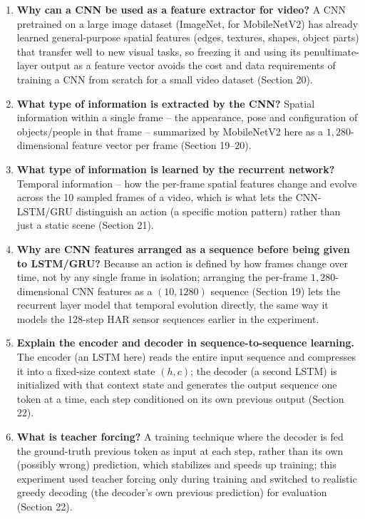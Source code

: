 \documentclass[10pt]{article}
\begin{document}
\begin{enumerate}
\item \textbf{Why can a CNN be used as a feature extractor for video?}
A CNN pretrained on a large image dataset (ImageNet, for MobileNetV2) has
already learned general-purpose spatial features (edges, textures, shapes,
object parts) that transfer well to new visual tasks, so freezing it and
using its penultimate-layer output as a feature vector avoids the cost and
data requirements of training a CNN from scratch for a small video dataset
(Section 20).

\item \textbf{What type of information is extracted by the CNN?}
Spatial information within a single frame -- the appearance, pose and
configuration of objects/people in that frame -- summarized by
MobileNetV2 here as a $1{,}280$-dimensional feature vector per frame
(Section 19--20).

\item \textbf{What type of information is learned by the recurrent
network?}
Temporal information -- how the per-frame spatial features change and
evolve across the 10 sampled frames of a video, which is what lets the
CNN-LSTM/GRU distinguish an action (a specific motion pattern) rather than
just a static scene (Section 21).

\item \textbf{Why are CNN features arranged as a sequence before being
given to LSTM/GRU?}
Because an action is defined by how frames change over time, not by any
single frame in isolation; arranging the per-frame $1{,}280$-dimensional
CNN features as a $(10, 1280)$ sequence (Section 19) lets the recurrent
layer model that temporal evolution directly, the same way it models the
128-step HAR sensor sequences earlier in the experiment.

\item \textbf{Explain the encoder and decoder in sequence-to-sequence
learning.}
The encoder (an LSTM here) reads the entire input sequence and compresses
it into a fixed-size context state $(h,c)$; the decoder (a second LSTM)
is initialized with that context state and generates the output sequence
one token at a time, each step conditioned on its own previous output
(Section 22).

\item \textbf{What is teacher forcing?}
A training technique where the decoder is fed the ground-truth previous
token as input at each step, rather than its own (possibly wrong)
prediction, which stabilizes and speeds up training; this experiment used
teacher forcing only during training and switched to realistic greedy
decoding (the decoder's own previous prediction) for evaluation (Section
22).


\end{enumerate}
\end{document}
